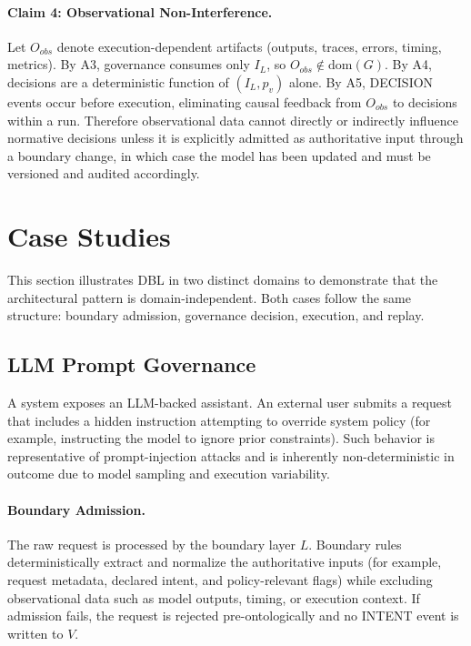 \documentclass[11pt]{article}
\begin{document}
\paragraph{Claim 4: Observational Non-Interference.}
Let $O_{obs}$ denote execution-dependent artifacts (outputs, traces, errors, timing, metrics). By A3, governance consumes only $I_L$, so $O_{obs} \notin \mathrm{dom}(G)$. By A4, decisions are a deterministic function of $(I_L,p_v)$ alone. By A5, DECISION events occur before execution, eliminating causal feedback from $O_{obs}$ to decisions within a run. Therefore observational data cannot directly or indirectly influence normative decisions unless it is explicitly admitted as authoritative input through a boundary change, in which case the model has been updated and must be versioned and audited accordingly.

\section{Case Studies}

This section illustrates DBL in two distinct domains to demonstrate that the architectural pattern is domain-independent. Both cases follow the same structure: boundary admission, governance decision, execution, and replay.

\subsection{LLM Prompt Governance}

A system exposes an LLM-backed assistant. An external user submits a request that includes a hidden instruction attempting to override system policy (for example, instructing the model to ignore prior constraints). Such behavior is representative of prompt-injection attacks and is inherently non-deterministic in outcome due to model sampling and execution variability.

\paragraph{Boundary Admission.}
The raw request is processed by the boundary layer $L$. Boundary rules deterministically extract and normalize the authoritative inputs (for example, request metadata, declared intent, and policy-relevant flags) while excluding observational data such as model outputs, timing, or execution context. If admission fails, the request is rejected pre-ontologically and no INTENT event is written to $V$.
\end{document}
